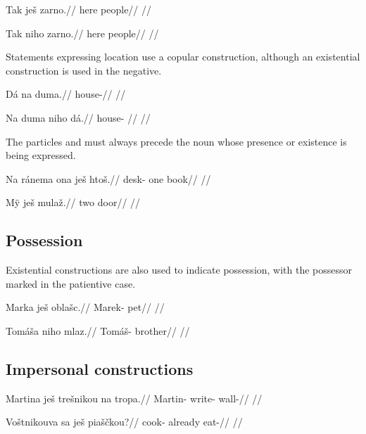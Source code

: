 \pex
\begingl
\gla Tak je\v{s} zarno.//
\glb here  people//
\glft {}//
\endgl
\xe

\pex
\begingl
\gla Tak niho zarno.//
\glb here  people//
\glft {}//
\endgl
\xe

Statements expressing location use a copular construction, although an existential construction is used in the negative.

\pex
\begingl
\gla D\'a na duma.//
\glb {}  house-//
\glft {}//
\endgl
\xe

\pex
\begingl
\gla Na duma niho d\'a.//
\glb {} house-  //
\glft {}//
\endgl
\xe

The particles  and  must always precede the noun whose presence or existence is being expressed.

\pex
\begingl
\gla Na r\'anema ona je\v{s} hto\v{s}.//
\glb {} desk- one  book//
\glft {}//
\endgl
\xe

\pex
\begingl
\gla M\"y je\v{s} mula\v{z}.//
\glb two  door//
\glft {}//
\endgl
\xe



\subsection{Possession}
Existential constructions are also used to indicate possession, with the possessor marked in the patientive case.

\pex
\begingl
\gla Marka je\v{s} obla\v{s}c.//
\glb Marek-  pet//
\glft {}//
\endgl
\xe

\pex
\begingl
\gla Tom\'a\v{s}a niho mlaz.//
\glb Tom\'a\v{s}-  brother//
\glft {}//
\endgl
\xe

\subsection{Impersonal constructions}
\pex
\begingl
\gla Martina je\v{s} tre\v{s}nikou na tropa.//
\glb Martin-  write-  wall-//
\glft {}//
\endgl
\xe

\pex
\begingl
\gla Vo\v{s}tnikouva sa je\v{s} pia\v{s}\v{c}kou?//
\glb cook- already  eat-//
\glft {}//
\endgl
\xe

